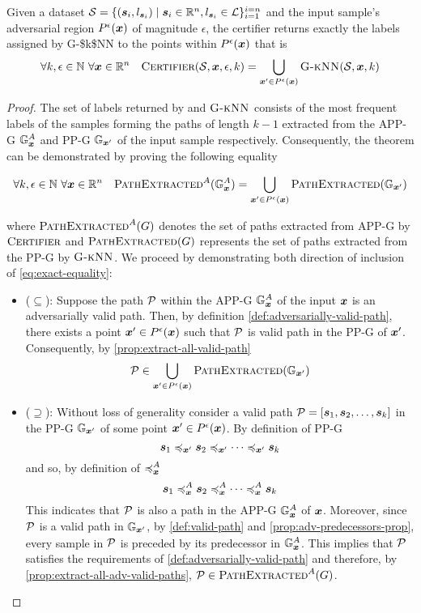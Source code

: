 \begin{theorem}
  Given a dataset $\set = \{(\sample, l_{\sample}) \mid \sample \in \R, l_{\sample} \in \mathcal{L}\}_{i=1}^{i=n}$ and the input sample's adversarial region $\pert$ of magnitude $\epsilon$, the certifier returns exactly the labels assigned by \acs{G-$k$NN} to the points within $\pert$ that is
  \[
    \forall k,\epsilon \in \N\ \forall \vinput \in \R\quad \algtitle{Certifier}(\set,\vinput, \epsilon, k) = \bigcup_{\x[]' \in \pert} \algtitle{G-kNN}(\set,\vinput,k)
  \]
\end{theorem}
\begin{proof}
The set of labels returned by  and $\algtitle{G-kNN}$ consists of the most frequent labels of the samples forming the paths of length $k-1$ extracted from the \acs{APP-G} $\APPG$ and \acs{PP-G} $\PPG[{\x[]'}]$ of the input sample respectively. Consequently, the theorem can be demonstrated by proving the following equality

\begin{equation}
\label{eq:exact-equality}
\forall k,\epsilon \in \N\ \forall \vinput \in \R\quad \algtitle{PathExtracted}^A(\APPG) = \bigcup_{\x[]' \in \pert} \algtitle{PathExtracted}(\PPG[{\x[]'}])
\end{equation}

\noindent where $\algtitle{PathExtracted}^A(G)$ denotes the set of paths extracted from \acs{APP-G} by $\algtitle{Certifier}$ and  $\algtitle{PathExtracted}(G)$ represents the set of paths extracted from the \acs{PP-G} by $\algtitle{G-kNN}$. We proceed by demonstrating both direction of inclusion of \autoref{eq:exact-equality}:

\begin{itemize}
  \item ($\bm{\subseteq}$): Suppose the path $\vpath$ within the \acs{APP-G} $\APPG$ of the input $\vinput$ is an adversarially valid path. Then, by definition \autoref{def:adversarially-valid-path}, there exists a point $\x[]' \in \pert$ such that $\vpath$ is valid path in the \acs{PP-G} of $\x[]'$. Consequently, by \autoref{prop:extract-all-valid-path}
  \[
     \vpath \in \bigcup_{\x[]' \in \pert} \algtitle{PathExtracted}(\PPG[{\x[]'}])
  \]
  \item ($\bm{\supseteq}$): Without loss of generality consider a valid path $\vpath = [\sample[1], \sample[2],\ldots,\sample[k]]$ in the \acs{PP-G} $\PPG[{\x[]'}]$ of some point $\vinput' \in \pert$. By definition of \acs{PP-G}
  \[
    \pre[\vinput']{\sample[1]}{\pre[\vinput']{\sample[2]}{\pre[\vinput']{\cdots}{\sample[k]}}}
  \]
  and so, by definition of $\apre{}{}$
  \[
    \apre{\sample[1]}{\apre{\sample[2]}{\apre{\cdots}{\sample[k]}}}
  \]
  This indicates that $\vpath$ is also a path in the \acs{APP-G} $\APPG$ of $\vinput$. Moreover, since $\vpath$ is a valid path in $\PPG[{\x[]'}]$, by \autoref{def:valid-path} and \autoref{prop:adv-predecessors-prop}, every sample in $\vpath$ is preceded by its predecessor in $\APPG$. This implies that $\vpath$ satisfies the requirements of \autoref{def:adversarially-valid-path} and therefore, by \autoref{prop:extract-all-adv-valid-paths}, $\vpath \in \algtitle{PathExtracted}^A(G)$. \qedhere
\end{itemize}

\end{proof}